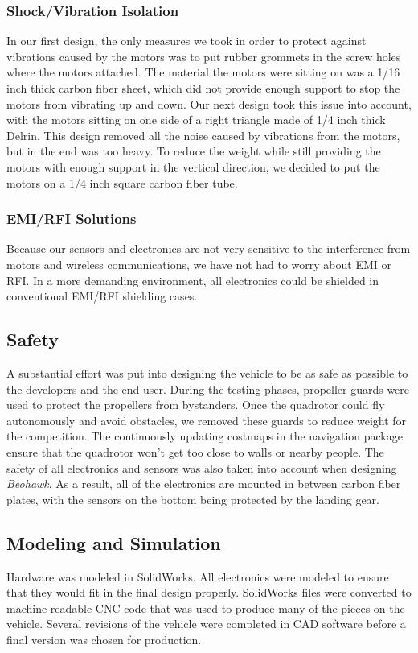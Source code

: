 \documentclass[12pt, letterpaper]{article}
\begin{document}
\subsubsection{Shock/Vibration Isolation}
In our first design, the only measures we took in order to protect against vibrations caused by the motors was to put rubber grommets in the screw holes where the motors attached.  The material the motors were sitting on was a 1/16 inch thick carbon fiber sheet, which did not provide enough support to stop the motors from vibrating up and down. Our next design took this issue into account, with the motors sitting on one side of a right triangle made of 1/4 inch thick Delrin.  This design removed all the noise caused by vibrations from the motors, but in the end was too heavy.  To reduce the weight while still providing the motors with enough support in the vertical direction, we decided to put the motors on a 1/4 inch square carbon fiber tube.

\subsubsection{EMI/RFI Solutions}
Because our sensors and electronics are not very sensitive to the interference from motors and wireless communications, we have not had to worry about EMI or RFI. In a more demanding environment, all electronics could be shielded in conventional EMI/RFI shielding cases.

\subsection{Safety}
A substantial effort was put into designing the vehicle to be as safe as possible to the developers and the end user. During the testing phases, propeller guards were used to protect the propellers from bystanders.  Once the quadrotor could fly autonomously and avoid obstacles, we removed these guards to reduce weight for the competition. The continuously updating costmaps in the navigation package ensure that the quadrotor won't get too close to walls or nearby people.  The safety of all electronics and sensors was also taken into account when designing \textit{Beohawk}.  As a result, all of the electronics are mounted in between carbon fiber plates, with the sensors on the bottom being protected by the landing gear.

\subsection{Modeling and Simulation}
Hardware was modeled in SolidWorks. All electronics were modeled to ensure that they would fit in the final design properly. SolidWorks files were converted to machine readable CNC code that was used to produce many of the pieces on the vehicle. Several revisions of the vehicle were completed in CAD software before a final version was chosen for production.
\end{document}
